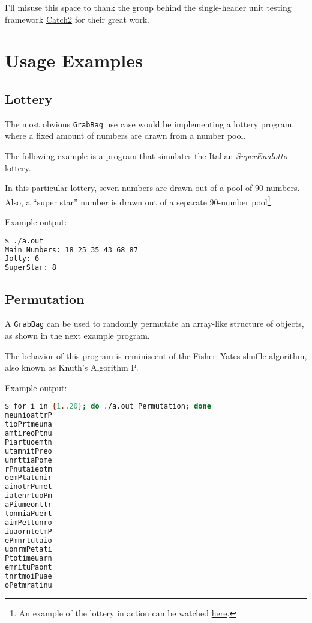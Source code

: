 \documentclass[a4paper,12pt]{article}
\begin{document}
I'll misuse this space to thank the group behind the single-header unit testing framework \href{https://github.com/catchorg/Catch2/}{Catch2} for their great work.

\newpage

\section{Usage Examples}

\subsection{Lottery}
The most obvious \texttt{GrabBag} use case would be implementing a lottery program, where a fixed amount of numbers are drawn from a number pool.

The following example is a program that simulates the Italian {\slshape SuperEnalotto} lottery. 

In this particular lottery, seven numbers are drawn out of a pool of 90 numbers. 
Also, a ``super star'' number is drawn out of a separate 90-number pool\footnote{An example of the lottery in action can be watched \href{https://www.youtube.com/watch?v=5xtAY_ouXgQ}{here}.}.



Example output:

\begin{lstlisting}[language=bash]
$ ./a.out 
Main Numbers: 18 25 35 43 68 87 
Jolly: 6
SuperStar: 8
\end{lstlisting}

\subsection{Permutation}

A \texttt{GrabBag} can be used to randomly permutate an array-like structure of objects, as shown in the next example program. 

The behavior of this program is reminiscent of the Fisher–Yates shuffle algorithm, also known as Knuth's Algorithm P.



Example output:

\begin{lstlisting}[language=bash]
$ for i in {1..20}; do ./a.out Permutation; done
meunioattrP
tioPrtmeuna
amtireoPtnu
Piartuoemtn
utamnitPreo
unrttiaPome
rPnutaieotm
oemPtatunir
ainotrPumet
iatenrtuoPm
aPiumeonttr
tonmiaPuert
aimPettunro
iuaorntetmP
ePmnrtutaio
uonrmPetati
Ptotimeuarn
emrituPaont
tnrtmoiPuae
oPetmratinu

\end{lstlisting}
\end{document}
